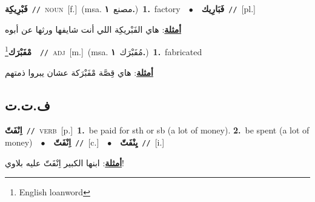 \documentclass[10pt,a4paper,twoside]{article} %
\begin{document}
\begin{multicols}{2}
{\setlength\topsep{0pt}\textbf{\foreignlanguage{arabic}{فَبْرِيكِة}}\ {\color{gray}\texttt{//}\color{black}}\ \textsc{noun}\ [f.]\ \color{gray}(msa. \foreignlanguage{arabic}{مصنع}~\foreignlanguage{arabic}{\textbf{١.}})\color{black}\ \textbf{1.}~factory\ \ $\bullet$\ \ \setlength\topsep{0pt}\textbf{\foreignlanguage{arabic}{فَبَارِيك}}\ {\color{gray}\texttt{//}\color{black}}\ [pl.]\  \begin{flushright}\color{gray}\foreignlanguage{arabic}{\textbf{\underline{\foreignlanguage{arabic}{أمثلة}}}: هاي الفَبْريكِة اللي أنت شايفها ورثها عن أبوه}\end{flushright}\color{black}} \vspace{2mm}

{\setlength\topsep{0pt}\textbf{\foreignlanguage{arabic}{مْفَبْرَك}}\footnote{English loanword}\ \ {\color{gray}\texttt{//}\color{black}}\ \textsc{adj}\ [m.]\ \color{gray}(msa. \foreignlanguage{arabic}{مُفَبْرَك}~\foreignlanguage{arabic}{\textbf{١.}})\color{black}\ \textbf{1.}~fabricated\  \begin{flushright}\color{gray}\foreignlanguage{arabic}{\textbf{\underline{\foreignlanguage{arabic}{أمثلة}}}: هاي قِصَّة مْفَبْرَكة عشان يبروا ذمتهم}\end{flushright}\color{black}} \vspace{2mm}

\vspace{-3mm}
\subsection*{\color{blue}\foreignlanguage{arabic}{ف.ت.ت}\color{blue}{}} 

{\setlength\topsep{0pt}\textbf{\foreignlanguage{arabic}{اِنْفَتّ}}\ {\color{gray}\texttt{//}\color{black}}\ \textsc{verb}\ [p.]\ \textbf{1.}~be paid for sth or sb (a lot of money).  \textbf{2.}~be spent (a lot of money)\ \ $\bullet$\ \ \setlength\topsep{0pt}\textbf{\foreignlanguage{arabic}{اِنْفَتّ}}\ {\color{gray}\texttt{//}\color{black}}\ [c.]\ \ $\bullet$\ \ \setlength\topsep{0pt}\textbf{\foreignlanguage{arabic}{يِنْفَتّ}}\ {\color{gray}\texttt{//}\color{black}}\ [i.]\  \begin{flushright}\color{gray}\foreignlanguage{arabic}{\textbf{\underline{\foreignlanguage{arabic}{أمثلة}}}: ابنها الكبير اِنْفَتّ عليه بلاوي!}\end{flushright}\color{black}} \vspace{2mm}


\end{multicols}
\end{document}
